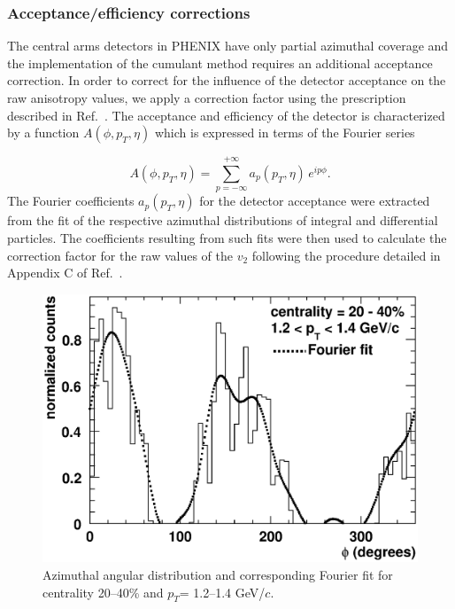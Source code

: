 \documentclass[aps,prc,superscriptaddress,showpacs,floatfix,twocolumn]{revtex4}
\newcommand \gevc{GeV/$c$\xspace}
\newcommand \pt{\mbox{$p_T$}\xspace}
\begin{document}
\subsubsection{Acceptance/efficiency corrections}
The central arms detectors in PHENIX have only partial azimuthal coverage and the implementation of the cumulant 
method requires an additional acceptance correction. In order to correct for the influence of the detector acceptance 
on the raw anisotropy values, we apply a correction factor using the prescription described in Ref.~\cite{Borghini:2001vi}. 
The acceptance and efficiency of the detector is characterized by a function $A(\phi, \pt, \eta)$ which is expressed in 
terms of the Fourier series

\begin{equation}\label{Aphi}
A(\phi,\pt,\eta) = \sum_{p=-\infty}^{+\infty} a_p(\pt,\eta)\, e^{ip\phi}.
\end{equation}
The Fourier coefficients $a_p(\pt,\eta)$ for the detector acceptance were 
extracted from the fit of the respective azimuthal distributions of 
integral and differential particles. The coefficients resulting from such 
fits were then used to calculate the correction factor for the raw values 
of the $v_2$ following the procedure detailed in Appendix C of 
Ref.~\cite{Borghini:2001vi}.

\begin{figure}[hbt]
\includegraphics[width=1.0\linewidth]{psidist-and-fit.eps}
\caption{\label{phiandfour} 
Azimuthal angular distribution and corresponding Fourier fit
for centrality 20--40\% and \pt = 1.2--1.4 \gevc.}
\end{figure}
\end{document}
